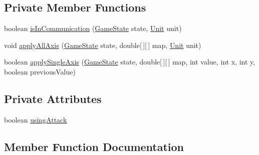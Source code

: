 \subsection*{Private Member Functions}
\begin{DoxyCompactItemize}
\item 
boolean \mbox{\hyperlink{classanalyse_1_1map_methods_1_1_abstract_static_map_method_a5f92c163d4402bbd591c2673d09fbbaf}{is\+In\+Communication}} (\mbox{\hyperlink{classgame_1_1game_state_1_1_game_state}{Game\+State}} state, \mbox{\hyperlink{classgame_1_1board_1_1_unit}{Unit}} unit)
\item 
void \mbox{\hyperlink{classanalyse_1_1map_methods_1_1_abstract_static_map_method_a99af8635f28b5755001b9dfbbeee6b30}{apply\+All\+Axis}} (\mbox{\hyperlink{classgame_1_1game_state_1_1_game_state}{Game\+State}} state, double\mbox{[}$\,$\mbox{]}\mbox{[}$\,$\mbox{]} map, \mbox{\hyperlink{classgame_1_1board_1_1_unit}{Unit}} unit)
\item 
boolean \mbox{\hyperlink{classanalyse_1_1map_methods_1_1_abstract_static_map_method_af36453d4f13bf86967d153d5e5575ad5}{apply\+Single\+Axis}} (\mbox{\hyperlink{classgame_1_1game_state_1_1_game_state}{Game\+State}} state, double\mbox{[}$\,$\mbox{]}\mbox{[}$\,$\mbox{]} map, int value, int x, int y, boolean previous\+Value)
\end{DoxyCompactItemize}
\subsection*{Private Attributes}
\begin{DoxyCompactItemize}
\item 
boolean \mbox{\hyperlink{classanalyse_1_1map_methods_1_1_abstract_static_map_method_ad4439fb5b50b2cc9174cc912426b876d}{using\+Attack}}
\end{DoxyCompactItemize}


\subsection{Member Function Documentation}
\mbox{\label{classanalyse_1_1map_methods_1_1_abstract_static_map_method_a99af8635f28b5755001b9dfbbeee6b30}} 
